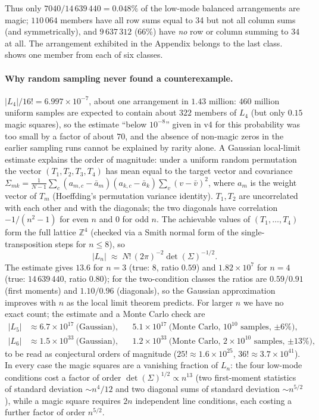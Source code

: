 Thus only $7040/14\,639\,440 = 0.048\%$ of the low-mode balanced arrangements are magic;
$110\,064$ members have all row sums equal to 34 but not all column sums (and symmetrically),
and $9\,637\,312$ (66\%) have \emph{no} row or column summing to $34$ at all.  The arrangement
exhibited in the Appendix belongs to the last class.   shows one member
from each of six classes.

\paragraph{Why random sampling never found a counterexample.}
$|L_4|/16! = 6.997\times10^{-7}$, about one arrangement in $1.43$ million: $460$ million uniform
samples are expected to contain about $322$ members of $L_4$ (but only $0.15$ magic squares), so the
estimate ``below $10^{-8}$'' given in v4 for this probability was too small by a factor of about $70$,
and the absence of non-magic zeros in the earlier sampling runs cannot be explained by rarity alone.
A Gaussian local-limit estimate explains the order
of magnitude: under a uniform random permutation the vector $(T_1,T_2,T_3,T_4)$ has mean equal to the
target vector and covariance $\Sigma_{mk} = \frac{1}{N-1}\sum_c (a_{m,c}-\bar a_m)(a_{k,c}-\bar a_k)\sum_v (v-\bar v)^2$,
where $a_m$ is the weight vector of $T_m$ (Hoeffding's permutation variance identity).  $T_1,T_2$ are
uncorrelated with each other and with the diagonals; the two diagonals have correlation $-1/(n^2-1)$
for even $n$ and $0$ for odd $n$.  The achievable values of $(T_1,\dots,T_4)$ form the full lattice
$\mathbb{Z}^4$ (checked via a Smith normal form of the single-transposition steps for $n\le 8$), so
\[
  |L_n| \;\approx\; N!\,(2\pi)^{-2}\det(\Sigma)^{-1/2}.
\]
The estimate gives $13.6$ for $n=3$ (true: $8$, ratio $0.59$) and $1.82\times10^{7}$ for $n=4$ (true:
$14\,639\,440$, ratio $0.80$); for the two-condition classes the ratios are $0.59/0.91$ (first moments)
and $1.10/0.96$ (diagonals), so the Gaussian approximation improves with $n$ as the local limit theorem
predicts.  For larger $n$ we have no exact count; the estimate and a Monte Carlo check are
\begin{align*}
  |L_5| &\approx 6.7\times10^{17}\ \text{(Gaussian)}, & &5.1\times10^{17}\ \text{(Monte Carlo, $10^{10}$ samples, $\pm 6\%$)},\\
  |L_6| &\approx 1.5\times10^{33}\ \text{(Gaussian)}, & &1.2\times10^{33}\ \text{(Monte Carlo, $2\times10^{10}$ samples, $\pm 13\%$)},
\end{align*}
to be read as conjectural orders of magnitude ($25!\approx1.6\times10^{25}$, $36!\approx3.7\times10^{41}$).
In every case the magic squares are a vanishing fraction of $L_n$: the four low-mode conditions
cost a factor of order $\det(\Sigma)^{1/2}\propto n^{13}$ (two first-moment statistics of standard
deviation $\sim n^{4}/12$ and two diagonal sums of standard deviation $\sim n^{5/2}$), while a magic
square requires $2n$ independent line conditions, each costing a further factor of order $n^{5/2}$.

